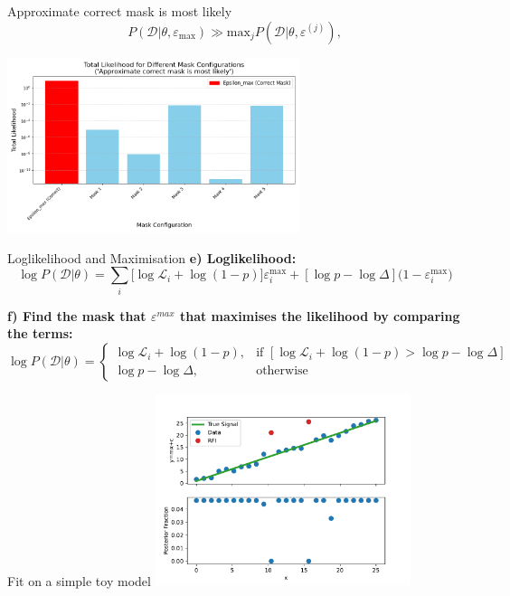 \documentclass[aspectratio=169]{beamer}
\begin{document}
\begin{frame}{Approximate correct mask is most likely}
  \footnotesize
  \begin{equation}
      P(\mathcal{D}|\theta, \varepsilon_{\mathrm{max}}) \gg \mathrm{max}_j P(\mathcal{D}|\theta,\varepsilon^{(j)})\label{eq:nlo},
  \end{equation}
  \begin{center}
    \includegraphics[width=0.64\textwidth]{images/dominant_mask_plot.png}
  \end{center}
\end{frame}

\begin{frame}{Loglikelihood and Maximisation}
  \footnotesize
  \textbf{e) Loglikelihood:}
  \begin{equation}
      \log{P(\mathcal{D}|\theta)} = \sum_{i}[{\log{\mathcal{L}_i}+\log({1-p})]\varepsilon^{\mathrm{max}}_i + [\log{p} - \log{\Delta}](1 - \varepsilon^\mathrm{max}_i})
  \end{equation}

  \textbf{f) Find the mask that $\varepsilon^{max}$ that maximises the likelihood by comparing the terms:}
  \begin{equation}
  \log P(\mathcal{D}|\theta) =
  \begin{cases}
  \log \mathcal{L}_i + \log(1 - p), & \text{if } [\log \mathcal{L}_i + \log(1 - p) > \log p - \log \Delta] \\
  \log p - \log \Delta, & \text{otherwise}
  \end{cases}
  \end{equation}
\end{frame}

\begin{frame}{Fit on a simple toy model}
    \centering
    \includegraphics[width=0.56\textwidth]{images/test.pdf}
\end{frame}
\end{document}
